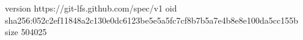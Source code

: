 version https://git-lfs.github.com/spec/v1
oid sha256:052c2ef11848a2c130e0dc6123be5e5a5fc7cf8b7b5a7e4b8e8e100da5cc155b
size 504025
